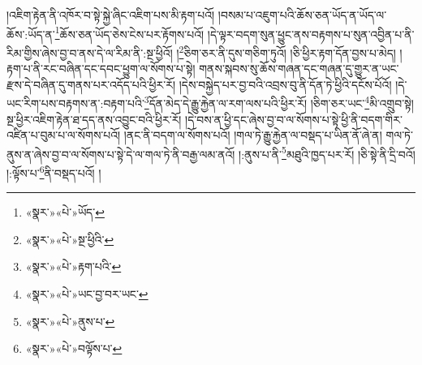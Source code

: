 །འཇིག་རྟེན་ནི་འཁོར་བ་སྟེ་སྐྱེ་ཞིང་འཇིག་པས་མི་རྟག་པའོ། །བསམ་པ་འཇུག་པའི་ཆོས་ཅན་ཡོད་ན་ཡོད་ལ་ཆོས་:ཡོད་ན་\footnote{«སྣར་»«པེ་»ཡོད་}ཆོས་ཅན་ཡོད་ཅེས་ངེས་པར་རྟོགས་པའོ། །དེ་ལྟར་བདག་སུན་ཕྱུང་ནས་བརྟགས་པ་སུན་འབྱིན་པ་ནི་རིམ་གྱིས་ཞེས་བྱ་བ་ནས་དེ་ལ་རིམ་ནི་:སྔ་ཕྱིའོ། །\footnote{«སྣར་»«པེ་»སྔ་ཕྱིའི་}ཅིག་ཅར་ནི་དུས་གཅིག་ཏུའོ། །ཅི་ཕྱིར་རྟག་དོན་བྱས་པ་མེད། །རྟག་པ་ནི་རང་བཞིན་དང་དབང་ཕྱུག་ལ་སོགས་པ་སྟེ། གནས་སྐབས་སུ་ཆོས་གཞན་དང་གཞན་དུ་གྱུར་ན་ཡང་རྫས་དེ་བཞིན་དུ་གནས་པར་འདོད་པའི་ཕྱིར་རོ། །དེས་བསྐྱེད་པར་བྱ་བའི་འབྲས་བུ་ནི་དོན་ཏེ་ཕྱིའི་དངོས་པོའོ། །དེ་ཡང་རིག་པས་བརྟགས་ན་:བརྟག་པའི་\footnote{«སྣར་»«པེ་»རྟག་པའི་}དོན་མེད་དེ་རྒྱུ་རྐྱེན་ལ་རག་ལས་པའི་ཕྱིར་རོ། །ཅིག་ཅར་ཡང་\footnote{«སྣར་»«པེ་»ཡང་བྱ་བར་ཡང་}མི་འགྲུབ་སྟེ། སྔ་ཕྱིར་འཇིག་རྟེན་ཐ་དད་ནས་འབྱུང་བའི་ཕྱིར་རོ། །དེ་བས་ན་ཕྱི་དང་ཞེས་བྱ་བ་ལ་སོགས་པ་སྟེ་ཕྱི་ནི་བདག་གིར་འཛིན་པ་བུམ་པ་ལ་སོགས་པའོ། །ནང་ནི་བདག་ལ་སོགས་པའོ། །གལ་ཏེ་རྒྱུ་རྐྱེན་ལ་བསྡད་པ་ཡིན་ནོ་ཞེ་ན། གལ་ཏེ་ནུས་ན་ཞེས་བྱ་བ་ལ་སོགས་པ་སྟེ་དེ་ལ་གལ་ཏེ་ནི་བརྒྱ་ལམ་ནའོ། །:ནུས་པ་ནི་\footnote{«སྣར་»«པེ་»ནུས་པ་}མཐུའི་ཁྱད་པར་རོ། །ཅི་སྟེ་ནི་དྲི་བའོ། །:ལྟོས་པ་\footnote{«སྣར་»«པེ་»བལྟོས་པ་}ནི་བསྡད་པའོ། །
